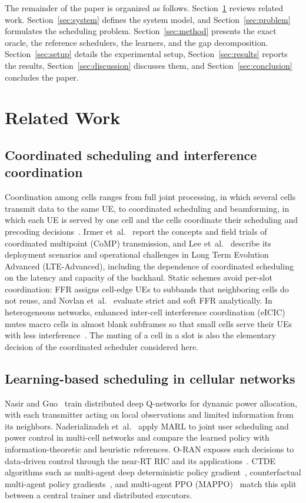 \documentclass{ieeeaccess}
\begin{document}
The remainder of the paper is organized as follows. Section~\ref{sec:related} reviews related work. Section~\ref{sec:system} defines the system model, and Section~\ref{sec:problem} formulates the scheduling problem. Section~\ref{sec:method} presents the exact oracle, the reference schedulers, the learners, and the gap decomposition. Section~\ref{sec:setup} details the experimental setup, Section~\ref{sec:results} reports the results, Section~\ref{sec:discussion} discusses them, and Section~\ref{sec:conclusion} concludes the paper.

\section{Related Work}
\label{sec:related}
\subsection{Coordinated scheduling and interference coordination}
Coordination among cells ranges from full joint processing, in which several cells transmit data to the same UE, to coordinated scheduling and beamforming, in which each UE is served by one cell and the cells coordinate their scheduling and precoding decisions~\cite{gesbert2010multicell}. Irmer et~al.~\cite{irmer2011comp} report the concepts and field trials of coordinated multipoint (CoMP) transmission, and Lee et~al.~\cite{lee2012comp} describe its deployment scenarios and operational challenges in Long Term Evolution Advanced (LTE-Advanced), including the dependence of coordinated scheduling on the latency and capacity of the backhaul. Static schemes avoid per-slot coordination: FFR assigns cell-edge UEs to subbands that neighboring cells do not reuse, and Novlan et~al.~\cite{novlan2011ffr} evaluate strict and soft FFR analytically. In heterogeneous networks, enhanced inter-cell interference coordination (eICIC) mutes macro cells in almost blank subframes so that small cells serve their UEs with less interference~\cite{lopezperez2011eicic}. The muting of a cell in a slot is also the elementary decision of the coordinated scheduler considered here.

\subsection{Learning-based scheduling in cellular networks}
Nasir and Guo~\cite{nasir2019power} train distributed deep Q-networks for dynamic power allocation, with each transmitter acting on local observations and limited information from its neighbors. Naderializadeh et~al.~\cite{naderializadeh2021resource} apply MARL to joint user scheduling and power control in multi-cell networks and compare the learned policy with information-theoretic and heuristic references. O-RAN exposes such decisions to data-driven control through the near-RT RIC and its applications~\cite{polese2023oran,bonati2021oran}. CTDE algorithms such as multi-agent deep deterministic policy gradient~\cite{lowe2017maddpg}, counterfactual multi-agent policy gradients~\cite{foerster2018coma}, and multi-agent PPO (MAPPO)~\cite{yu2022mappo} match this split between a central trainer and distributed executors.
\end{document}
